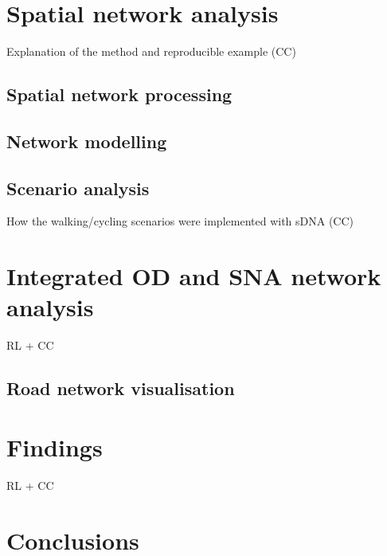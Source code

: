 \documentclass[galley]{jtlu-article-2col}
\begin{document}
\hypertarget{spatial-network-analysis}{%
\section{Spatial network analysis}\label{spatial-network-analysis}}

Explanation of the method and reproducible example (CC)

\hypertarget{spatial-network-processing}{%
\subsection{Spatial network processing}\label{spatial-network-processing}}

\hypertarget{network-modelling}{%
\subsection{Network modelling}\label{network-modelling}}

\hypertarget{scenario-analysis}{%
\subsection{Scenario analysis}\label{scenario-analysis}}

How the walking/cycling scenarios were implemented with sDNA (CC)

\hypertarget{integrated-od-and-sna-network-analysis}{%
\section{Integrated OD and SNA network analysis}\label{integrated-od-and-sna-network-analysis}}

RL + CC

\hypertarget{road-network-visualisation}{%
\subsection{Road network visualisation}\label{road-network-visualisation}}

\hypertarget{findings}{%
\section{Findings}\label{findings}}

RL + CC

\hypertarget{conclusions}{%
\section{Conclusions}\label{conclusions}}
\end{document}
